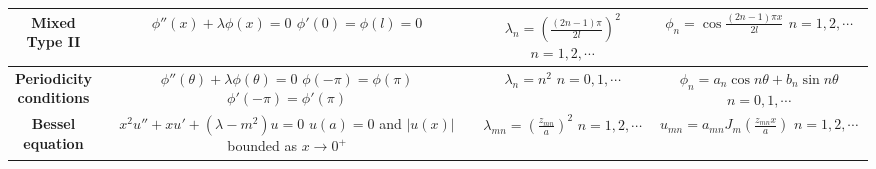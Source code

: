\begin{enumerate}
\begin{center}
\begin{tabular}{|c|c|c|c|}
    \parbox[c][30pt]{90pt}{\centering \textbf{Mixed \\ \vspace{10pt} Type II}} & 
    \parbox[c][60pt]{90pt}{\centering $\phi''(x) + \lambda \phi(x)=0$ \\ \vspace{10pt} $\phi'(0)=\phi(l)=0$}
    & 
    \parbox[c][60pt]{100pt}{\centering $\displaystyle \lambda_{n}=\left( \frac{(2n-1)\pi}{2l} \right)^{2}$ \\ \vspace{10pt} $n=1, 2, \cdots$} & 
    \parbox[c][60pt]{100pt}{\centering $\displaystyle \phi_{n} = \cos\frac{(2n-1)\pi x}{2l}$ \\ \vspace{10pt} $n=1, 2, \cdots$} \\
    \hline
    
    \parbox[c][30pt]{90pt}{\centering \textbf{Periodicity \\ \vspace{10pt} conditions}} & 
    \parbox[c][80pt]{90pt}{\centering $\phi''(\theta) + \lambda \phi(\theta)=0$ \\ \vspace{10pt} $\phi(-\pi)=\phi(\pi)$ \\ \vspace{10pt} $\phi'(-\pi)=\phi'(\pi)$}
    & 
    \parbox[c][60pt]{100pt}{\centering $\displaystyle \lambda_{n}=n^{2}$ \\ \vspace{10pt} $n=0, 1, \cdots$} & 
    \parbox[c][60pt]{120pt}{\centering $ \phi_{n} = a_{n}\cos n \theta + b_{n}\sin n \theta$ \\ \vspace{10pt} $n=0, 1, \cdots$} \\
    \hline
    
    \parbox[c][30pt]{90pt}{\centering \textbf{Bessel \\ \vspace{10pt} equation}} & 
    \parbox[c][80pt]{120pt}{\centering $x^{2}u'' + x u'+ (\lambda - m^{2}) u=0$ \\ \vspace{10pt} $u(a)=0$ and $|u(x)|$ \\ \vspace{10pt} bounded as $x\to 0^{+}$}
    & 
    \parbox[c][60pt]{100pt}{\centering $\displaystyle \lambda_{mn}=\left( \frac{z_{mn}}{a} \right)^{2}$ \\ \vspace{10pt} $n=1, 2, \cdots$} & 
    \parbox[c][60pt]{120pt}{\centering $ u_{mn} = a_{mn}J_{m}\left( \frac{z_{mn}x}{a} \right)$ \\ \vspace{10pt} $n=1, 2, \cdots$} \\
    \hline
    

\end{tabular}
\end{center}
\end{enumerate}
